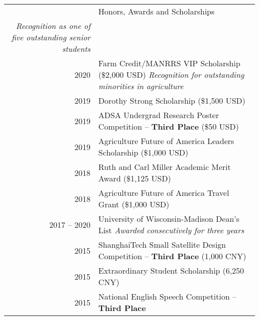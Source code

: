 \documentclass[letterpaper, 11pt]{article}
\newcommand{\headingfont}{\Large\color{OliveGreen}}
\newenvironment{SectionTableSingleSpace}[1]{
	\renewcommand*{\arraystretch}{1.2}
	\setlength{\tabcolsep}{10pt}
	\begin{longtable}{Rp{5.2in}} & #1 \\[0.6em]}
{\end{longtable}\vspace{-.3cm}}
\begin{document}
\begin{SectionTableSingleSpace}{\headingfont Honors, Awards and Scholarships}
\textit{Recognition as one of five outstanding senior students} \\
2020 & 
Farm Credit/MANRRS VIP Scholarship (\$2,000 USD) \newline
\textit{Recognition for outstanding minorities in agriculture} \\
2019 & 
Dorothy Strong Scholarship (\$1,500 USD) \\
2019 & 
ADSA Undergrad Research Poster Competition -- \textbf{Third Place} (\$50 USD) \\
2019 & 
Agriculture Future of America Leaders Scholarship (\$1,000 USD) \\
2018 & 
Ruth and Carl Miller Academic Merit Award (\$1,125 USD) \\
2018 & 
Agriculture Future of America Travel Grant (\$1,000 USD) \\
2017 -- 2020 & 
University of Wisconsin-Madison Dean's List \newline
\textit{Awarded consecutively for three years} \\
2015 & 
ShanghaiTech Small Satellite Design Competition -- \textbf{Third Place} (1,000 CNY) \\
2015 & 
Extraordinary Student Scholarship (6,250 CNY) \\
2015 & 
National English Speech Competition -- \textbf{Third Place}
\end{SectionTableSingleSpace}
\end{document}
